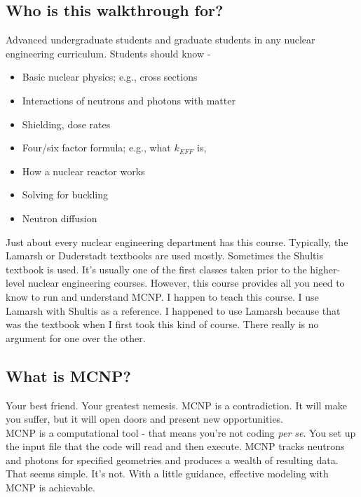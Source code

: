 \documentclass[11pt,a4paper]{article}
\begin{document}
\subsection{Who is this walkthrough for?}
\noindent Advanced undergraduate students and graduate students in any nuclear engineering curriculum. Students should know - 
\begin{itemize}[leftmargin=*,topsep=0pt,itemsep=-1ex,partopsep=1ex,parsep=1ex]
    \item Basic nuclear physics; e.g., cross sections
    \item Interactions of neutrons and photons with matter
    \item Shielding, dose rates
    \item Four/six factor formula; e.g., what $k_{EFF}$ is,
    \item How a nuclear reactor works
    \item Solving for buckling
    \item Neutron diffusion
\end{itemize}
\vspace*{\baselineskip}

\noindent Just about every nuclear engineering department has this course. Typically, the Lamarsh or Duderstadt textbooks are used mostly. Sometimes the Shultis textbook is used. It's usually one of the first classes taken prior to the higher-level nuclear engineering courses. However, this course provides all you need to know to run and understand MCNP. I happen to teach this course. I use Lamarsh with Shultis as a reference. I happened to use Lamarsh because that was the textbook when I first took this kind of course. There really is no argument for one over the other.

\subsection{What is MCNP?}
\noindent Your best friend. Your greatest nemesis. MCNP is a contradiction. It will make you suffer, but it will open doors and present new opportunities. \\

\noindent MCNP is a computational tool - that means you're not coding \textit{per se}. You set up the input file that the code will read and then execute. MCNP tracks neutrons and photons for specified geometries and produces a wealth of resulting data. That seems simple. It's not. With a little guidance, effective modeling with MCNP is achievable. 
\end{document}
